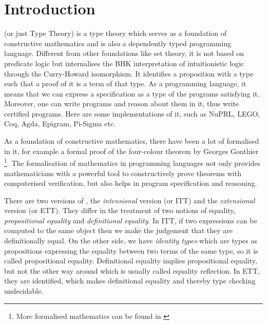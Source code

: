 \chapter{Introduction}

\mltt (or just Type Theory) is a type theory which serves as a foundation of constructive mathematics and is also a dependently typed programming language. Different from other foundations like set theory, it is not based on predicate logic but internalises the BHK interpretation of intuitionistic logic through the Curry-Howard isomorphism. It identifies a proposition with a type such that a proof of it is a term of that type. 
As a programming language, it means that we can express a specification as a type of the programs satisfying it.
Moreover, one can write programs and reason about them in it, thus write certified programs. Here are some implementations of it, such as NuPRL, LEGO, Coq, Agda, Epigram, Pi-Sigma etc.


As a foundation of constructive mathematics, there have been a lot of \maths formalised in it, for example a formal proof of the four-colour theorem by Georges Gonthier \cite{gonthier08ams} \footnote{More formalised mathematics can be found in \cite{sbfm}}. The formalisation of mathematics in programming languages not only provides mathematicians with a powerful tool to constructively prove theorems with computerised verification, but also helps in program specification and reasoning. 

There are two versions of \mltt, the \emph{intensional} version (\itt or ITT) and the \emph{extensional} version (\ett or ETT).  They differ in the treatment of two notions of equality, \emph{propositional equality} and \emph{definitional equality}.  In ITT, if two expressions can be computed to the same object then we make the judgement that they are definitionally equal. On the other side, we have \emph{identity types} which are types as propositions expressing the equality between two terms of the same type, so it is called propositional equality. Definitional equality implies propositional equality, but not the other way around which is usually called equality reflection.
In ETT, they are identified, which makes definitional equality and thereby type checking undecidable. 



